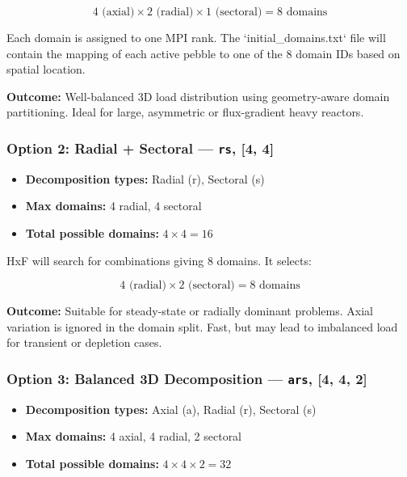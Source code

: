 \documentclass{article}
\begin{document}
\[
4 \text{ (axial)} \times 2 \text{ (radial)} \times 1 \text{ (sectoral)} = 8 \text{ domains}
\]

Each domain is assigned to one MPI rank. The `initial\_domains.txt` file will contain the mapping of each active pebble to one of the 8 domain IDs based on spatial location.

\textbf{Outcome:} Well-balanced 3D load distribution using geometry-aware domain partitioning. Ideal for large, asymmetric or flux-gradient heavy reactors.

\vspace{0.5em}

\subsubsection*{Option 2: Radial + Sectoral --- \texttt{rs}, [4, 4]}

\begin{itemize}
    \item \textbf{Decomposition types:} Radial (r), Sectoral (s)
    \item \textbf{Max domains:} 4 radial, 4 sectoral
    \item \textbf{Total possible domains:} $4 \times 4 = 16$
\end{itemize}

HxF will search for combinations giving 8 domains. It selects:

\[
4 \text{ (radial)} \times 2 \text{ (sectoral)} = 8 \text{ domains}
\]

\textbf{Outcome:} Suitable for steady-state or radially dominant problems. Axial variation is ignored in the domain split. Fast, but may lead to imbalanced load for transient or depletion cases.

\vspace{0.5em}

\subsubsection*{Option 3: Balanced 3D Decomposition --- \texttt{ars}, [4, 4, 2]}

\begin{itemize}
    \item \textbf{Decomposition types:} Axial (a), Radial (r), Sectoral (s)
    \item \textbf{Max domains:} 4 axial, 4 radial, 2 sectoral
    \item \textbf{Total possible domains:} $4 \times 4 \times 2 = 32$
\end{itemize}
\end{document}
